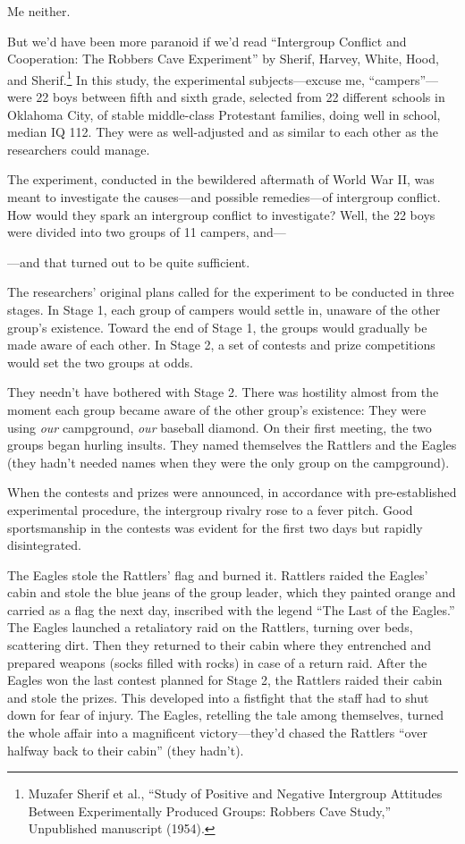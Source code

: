{
 Me neither.}

{
 But we'd have been more paranoid if
we'd read ``Intergroup Conflict and
Cooperation: The Robbers Cave Experiment'' by Sherif,
Harvey, White, Hood, and Sherif.\footnote{Muzafer Sherif et al., ``Study of Positive and
Negative Intergroup Attitudes Between Experimentally Produced Groups:
Robbers Cave Study,'' Unpublished manuscript (1954).} In this study, the
experimental subjects---excuse me,
``campers''---were 22 boys between
fifth and sixth grade, selected from 22 different schools in Oklahoma
City, of stable middle-class Protestant families, doing well in school,
median IQ 112. They were as well-adjusted and as similar to each other
as the researchers could manage.}

{
 The experiment, conducted in the bewildered aftermath of World War
II, was meant to investigate the causes---and possible remedies---of
intergroup conflict. How would they spark an intergroup conflict to
investigate? Well, the 22 boys were divided into two groups of 11
campers, and---}

{
 {}---and that turned out to be quite sufficient.}

{
 The researchers' original plans called for the
experiment to be conducted in three stages. In Stage 1, each group of
campers would settle in, unaware of the other group's
existence. Toward the end of Stage 1, the groups would gradually be
made aware of each other. In Stage 2, a set of contests and prize
competitions would set the two groups at odds.}

{
 They needn't have bothered with Stage 2. There was
hostility almost from the moment each group became aware of the other
group's existence: They were using \textit{our}
campground, \textit{our} baseball diamond. On their first meeting, the
two groups began hurling insults. They named themselves the Rattlers
and the Eagles (they hadn't needed names when they were
the only group on the campground).}

{
 When the contests and prizes were announced, in accordance with
pre-established experimental procedure, the intergroup rivalry rose to
a fever pitch. Good sportsmanship in the contests was evident for the
first two days but rapidly disintegrated.}

{
 The Eagles stole the Rattlers' flag and burned it.
Rattlers raided the Eagles' cabin and stole the blue
jeans of the group leader, which they painted orange and carried as a
flag the next day, inscribed with the legend ``The
Last of the Eagles.'' The Eagles launched a
retaliatory raid on the Rattlers, turning over beds, scattering dirt.
Then they returned to their cabin where they entrenched and prepared
weapons (socks filled with rocks) in case of a return raid. After the
Eagles won the last contest planned for Stage 2, the Rattlers raided
their cabin and stole the prizes. This developed into a fistfight that
the staff had to shut down for fear of injury. The Eagles, retelling
the tale among themselves, turned the whole affair into a magnificent
victory---they'd chased the Rattlers
``over halfway back to their cabin''
(they hadn't).}

